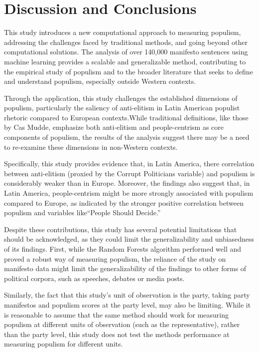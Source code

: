 \documentclass[12pt,letterpaper]{article}
\begin{document}
\section{Discussion and Conclusions} 

\vspace{.25cm}
\noindent This study introduces a new computational approach to measuring populism, addressing the challenges faced by traditional methods, and going beyond other computational solutions. The analysis of over 140,000 manifesto sentences using machine learning provides a scalable and generalizable method, contributing to the empirical study of populism and to the broader literature that seeks to define and understand populism, especially outside Western contexts. 

Through the application, this study challenges the established dimensions of populism, particularly the saliency of anti-elitism in Latin American populist rhetoric compared to European contexts.While traditional definitions, like those by Cas Mudde, emphasize both anti-elitism and people-centrism as core components of populism, the results of the analysis suggest there may be a need to re-examine these dimensions in non-Western contexts. 

Specifically, this study provides evidence that, in Latin America, there correlation between anti-elitism (proxied by the Corrupt Politicians variable) and populism is considerably weaker than in Europe. Moreover, the findings also suggest that, in Latin America, people-centrism might be more strongly associated with populism compared to Europe, as indicated by the stronger positive correlation between populism and variables like“People Should Decide.”

Despite these contributions, this study has several potential limitations that should be acknowledged, as they could limit the generalizability and unbiasedness of its findings. First, while the Random Forests algorithm performed well and proved a robust way of measuring populism, the reliance of the study on manifesto data might limit the generalizability of the findings to other forms of political corpora, such as speeches, debates or media posts. 

Similarly, the fact that this study's unit of observation is the party, taking party manifestos and populism scores at the party level, may also be limiting. While it is reasonable to assume that the same method should work for measuring populism at different units of observation (such as the representative), rather than the party level, this study does not test the methods performance at measuring populism for different units. 
\end{document}
